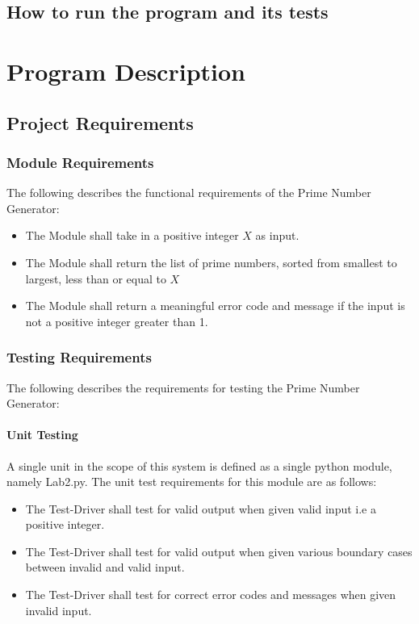 \documentclass[]{article}
\begin{document}
\subsection{How to run the program and its tests}


\section{Program Description}

\subsection{Project Requirements}

\subsubsection{Module Requirements}
The following describes the functional requirements of the Prime Number Generator:

\begin{itemize}
	\item The Module shall take in a positive integer $X$ as input.
	
	\item The Module shall return the list of prime numbers, sorted from smallest to largest, less than or equal to $X$  

	\item The Module shall return a meaningful error code and message if the input is not a positive integer greater than 1.
\end{itemize}

\subsubsection{Testing Requirements}
The following describes the requirements for testing the Prime Number Generator:
\paragraph{Unit Testing}
A single unit in the scope of this system is defined as a single python module, namely Lab2.py. The unit test requirements for this module are as follows:
\begin{itemize}
	\item  The Test-Driver shall test for valid output when given valid input i.e a positive integer.
	\item  The Test-Driver shall test for valid output when given various boundary cases between invalid and valid input.
	\item  The Test-Driver shall test for correct error codes and messages when given invalid input.
\end{itemize}
\end{document}
